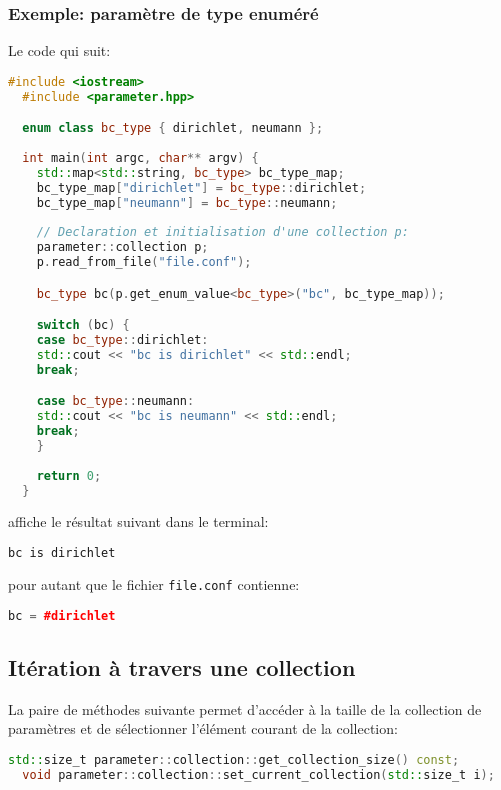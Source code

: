 \subsubsection{Exemple: param\`etre de type enum\'er\'e}
Le code qui suit:
\begin{lstlisting}[language=c++,frame=single,basicstyle=\ttfamily\footnotesize]
  #include <iostream>
  #include <parameter.hpp> 

  enum class bc_type { dirichlet, neumann };
  
  int main(int argc, char** argv) {
    std::map<std::string, bc_type> bc_type_map;
    bc_type_map["dirichlet"] = bc_type::dirichlet;
    bc_type_map["neumann"] = bc_type::neumann;
    
    // Declaration et initialisation d'une collection p:
    parameter::collection p;
    p.read_from_file("file.conf");

    bc_type bc(p.get_enum_value<bc_type>("bc", bc_type_map));

    switch (bc) {
    case bc_type::dirichlet:
    std::cout << "bc is dirichlet" << std::endl;
    break;

    case bc_type::neumann:
    std::cout << "bc is neumann" << std::endl;
    break;
    }
    
    return 0;
  }
\end{lstlisting}
affiche le r\'esultat suivant dans le terminal:
\begin{lstlisting}[language=c++,frame=single,basicstyle=\ttfamily\footnotesize]
  bc is dirichlet
\end{lstlisting}
pour autant que le fichier \texttt{file.conf} contienne:
\begin{lstlisting}[language=c++,frame=single,basicstyle=\ttfamily\footnotesize]
  bc = #dirichlet
\end{lstlisting}


\subsection{It\'eration \`a travers une collection}
La paire de m\'ethodes suivante permet d'acc\'eder \`a la taille de la
collection de param\`etres et de s\'electionner l'\'el\'ement courant
de la collection:
\begin{lstlisting}[language=c++,frame=single,basicstyle=\ttfamily\footnotesize]
  std::size_t parameter::collection::get_collection_size() const;
  void parameter::collection::set_current_collection(std::size_t i);  
\end{lstlisting}

